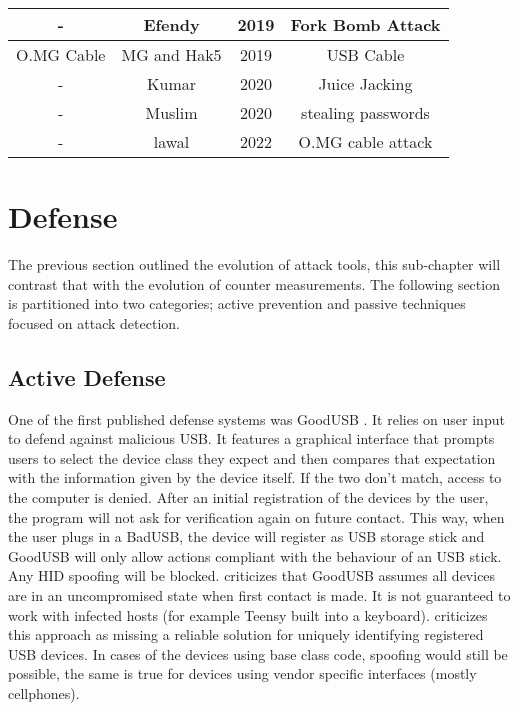 \begin{center}
\begin{tabular}{|c c c c|}
 \hline
  - & Efendy\cite{efendyExploringPossibilityUSB2019} & 2019 & Fork Bomb Attack \\
 \hline
 O.MG Cable & MG and Hak5  \cite{hak5MGCable} \cite{MGCable2019a} & 2019 & USB Cable \\
 \hline
- & Kumar \cite{kumarJuiceJackingUSB2020} & 2020 & Juice Jacking \\
\hline
- & Muslim \cite{muslimImplementationAnalysisUSB2020} & 2020 & stealing passwords \\
\hline
-  & lawal \cite{lawalFacilitatingCyberenabledFraud2022} & 2022 & O.MG cable attack \\
 \hline 
\end{tabular}
\end{center}

\section{Defense}

The previous section outlined the evolution of attack tools, this sub-chapter will contrast that with the evolution of counter measurements. 
The following section is partitioned into two categories; active prevention and passive techniques focused on attack detection.

\subsection{Active Defense}

One of the first published defense systems was GoodUSB \cite{tianDefendingMaliciousUSB2015}. It relies on user input to defend against malicious USB. It features a graphical interface that prompts users to select the device class they expect and then compares that expectation with the information given by the device itself. If the two don't match, access to the computer is denied. After an initial registration of the devices by the user, the program will not ask for verification again on future contact. This way, when the user plugs in a BadUSB, the device will register as USB storage stick and GoodUSB will only allow actions compliant with the behaviour of an USB stick. Any HID spoofing will be blocked.
\cite{nissimUSBbasedAttacks2017} criticizes that GoodUSB assumes all devices are in an uncompromised state when first contact is made. It is not guaranteed to work with infected hosts (for example Teensy built into a keyboard). 
\cite{mohammadmoradiMakingWhitelistingBasedDefense2018} criticizes this approach as missing a reliable solution for uniquely identifying registered USB devices. In cases of the devices using base class code, spoofing would still be possible, the same is true for devices using vendor specific interfaces (mostly cellphones). 

